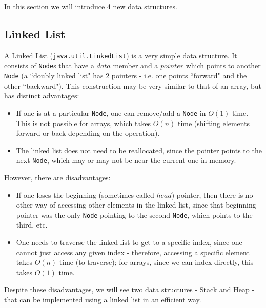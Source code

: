 %
In this section we will introduce 4 new data structures.

\subsection{Linked List}
A Linked List (\verb|java.util.LinkedList|) is a very simple data structure. It consists of \verb|Node|s that have a $data$ member and a $pointer$ which points to another \verb|Node| (a ``doubly linked list" has 2 pointers - i.e. one points ``forward" and the other ``backward"). This construction may be very similar to that of an array, but has distinct advantages:
\begin{itemize}
\item If one is at a particular \verb|Node|, one can remove/add a \verb|Node| in $O(1)$ time. This is not possible for arrays, which takes $O(n)$ time (shifting elements forward or back depending on the operation).
\item The linked list does not need to be reallocated, since the pointer points to the next \verb|Node|, which may or may not be near the current one in memory.
\end{itemize}
However, there are disadvantages:
\begin{itemize}
\item If one loses the beginning (sometimes called $head$) pointer, then there is no other way of accessing other elements in the linked list, since that beginning pointer was the only \verb|Node| pointing to the second \verb|Node|, which points to the third, etc.
\item One needs to traverse the linked list to get to a specific index, since one cannot just access any given index - therefore, accessing a specific element takes $O(n)$ time (to traverse); for arrays, since we can index directly, this takes $O(1)$ time.
\end{itemize}
Despite these disadvantages, we will see two data structures - Stack and Heap - that can be implemented using a linked list in an efficient way. 

